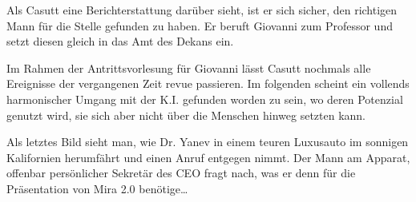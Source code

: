 \documentclass[11pt,a4paper,ngerman]{scrreprt}
\begin{document}
Als Casutt eine Berichterstattung darüber sieht, ist er sich sicher, den
richtigen Mann für die Stelle gefunden zu haben. Er beruft Giovanni zum
Professor und setzt diesen gleich in das Amt des Dekans ein.

Im Rahmen der Antrittsvorlesung für Giovanni lässt Casutt nochmals alle
Ereignisse der vergangenen Zeit revue passieren. Im folgenden scheint ein
vollends harmonischer Umgang mit der K.I. gefunden worden zu sein, wo deren
Potenzial genutzt wird, sie sich aber nicht über die Menschen hinweg setzten
kann.

Als letztes Bild sieht man, wie Dr. Yanev in einem teuren Luxusauto im sonnigen
Kalifornien herumfährt und einen Anruf entgegen nimmt. Der Mann am Apparat,
offenbar persönlicher Sekretär des CEO fragt nach, was er denn für die
Präsentation von Mira 2.0 benötige\ldots{}
\end{document}
